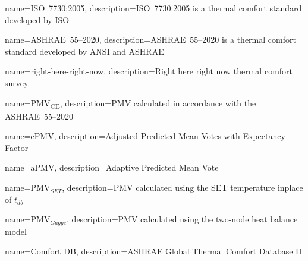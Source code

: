 \usepackage[nonumberlist,nogroupskip]{glossaries}


{
name={ISO~7730:2005},
description={ISO~7730:2005 is a thermal comfort standard developed by ISO}
}

{
name={ASHRAE~55--2020},
description={ASHRAE~55--2020 is a thermal comfort standard developed by ANSI and ASHRAE}
}

{
name={right-here-right-now},
description={Right here right now thermal comfort survey}
}

{
name={PMV\textsubscript{CE}},
description={PMV calculated in accordance with the ASHRAE~55--2020}
}

{
name={ePMV},
description={Adjusted Predicted Mean Votes with Expectancy Factor}
}

{
name={aPMV},
description={Adaptive Predicted Mean Vote}
}

{
name={PMV$_{SET}$},
description={PMV calculated using the SET temperature inplace of $t_{db}$}
}

{
name={PMV$_{Gagge}$},
description={PMV calculated using the two-node heat balance model}
}

{
name={Comfort DB},
description={ASHRAE Global Thermal Comfort Database II}
}

\makenoidxglossaries
